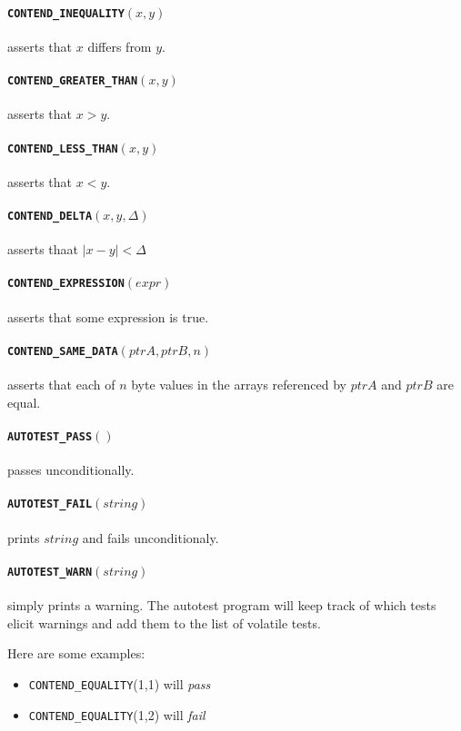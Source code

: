\documentclass[11pt,twoside]{report}
\begin{document}
\paragraph{{\tt CONTEND\_INEQUALITY}$(x,y)$} asserts that $x$ differs from
$y$.
\paragraph{{\tt CONTEND\_GREATER\_THAN}$(x,y)$} asserts that $x>y$.
\paragraph{{\tt CONTEND\_LESS\_THAN}$(x,y)$} asserts that $x<y$.
\paragraph{{\tt CONTEND\_DELTA}$(x,y,\Delta)$} asserts thaat $|x-y|<\Delta$
\paragraph{{\tt CONTEND\_EXPRESSION}$(expr)$} asserts that some expression is
true.
\paragraph{{\tt CONTEND\_SAME\_DATA}$(ptrA,ptrB,n)$} asserts that each of $n$
byte values in the arrays referenced by $ptrA$ and $ptrB$ are equal.
\paragraph{{\tt AUTOTEST\_PASS}$()$} passes unconditionally.
\paragraph{{\tt AUTOTEST\_FAIL}$(string)$} prints $string$ and fails
unconditionaly.
\paragraph{{\tt AUTOTEST\_WARN}$(string)$} simply prints a warning.
The autotest program will keep track of which tests elicit warnings and add
them to the list of volatile tests.

Here are some examples:
\begin{itemize}
\item[] {\tt CONTEND\_EQUALITY}(1,1) will {\it pass}
\item[] {\tt CONTEND\_EQUALITY}(1,2) will {\it fail}
\end{itemize}
\end{document}
